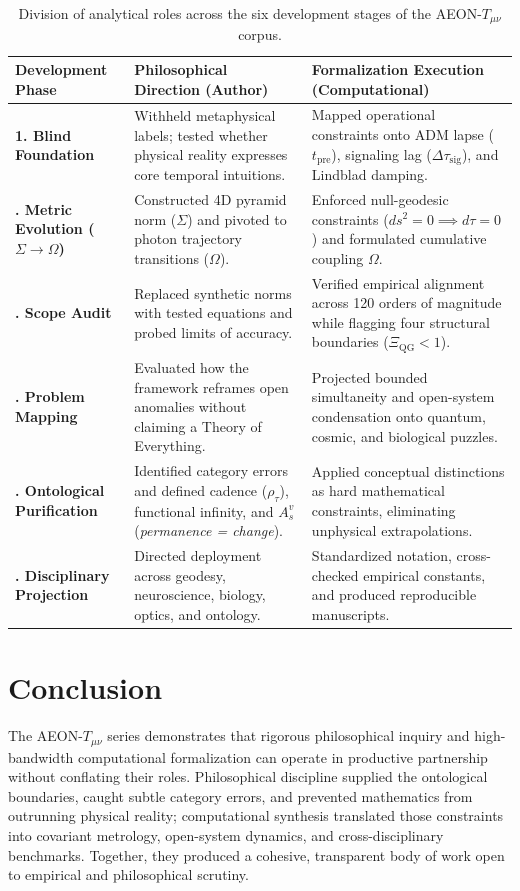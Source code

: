 \documentclass[11pt,a4paper]{article}
\begin{document}
\begin{table}[h!]
\centering
\small
\begin{tabularx}{\textwidth}{>{\bfseries}l X X}
\toprule
Development Phase & Philosophical Direction (Author) & Formalization Execution (Computational) \\
\midrule
1. Blind Foundation & Withheld metaphysical labels; tested whether physical reality expresses core temporal intuitions. & Mapped operational constraints onto ADM lapse ($t_{\mathrm{pre}}$), signaling lag ($\Delta\tau_{\mathrm{sig}}$), and Lindblad damping. \\
\addlinespace
2. Metric Evolution ($\Sigma \to \Omega$) & Constructed 4D pyramid norm ($\Sigma$) and pivoted to photon trajectory transitions ($\Omega$). & Enforced null-geodesic constraints ($ds^2 = 0 \implies d\tau = 0$) and formulated cumulative coupling $\Omega$. \\
\addlinespace
3. Scope Audit & Replaced synthetic norms with tested equations and probed limits of accuracy. & Verified empirical alignment across 120 orders of magnitude while flagging four structural boundaries ($\Xi_{\mathrm{QG}} < 1$). \\
\addlinespace
4. Problem Mapping & Evaluated how the framework reframes open anomalies without claiming a Theory of Everything. & Projected bounded simultaneity and open-system condensation onto quantum, cosmic, and biological puzzles. \\
\addlinespace
5. Ontological Purification & Identified category errors and defined cadence ($\rho_\tau$), functional infinity, and $A_s^v$ (\emph{permanence = change}). & Applied conceptual distinctions as hard mathematical constraints, eliminating unphysical extrapolations. \\
\addlinespace
6. Disciplinary Projection & Directed deployment across geodesy, neuroscience, biology, optics, and ontology. & Standardized notation, cross-checked empirical constants, and produced reproducible manuscripts. \\
\bottomrule
\end{tabularx}
\caption{Division of analytical roles across the six development stages of the AEON-$T_{\mu\nu}$ corpus.}
\end{table}

\section{Conclusion}

The AEON-$T_{\mu\nu}$ series demonstrates that rigorous philosophical inquiry and high-bandwidth computational formalization can operate in productive partnership without conflating their roles. Philosophical discipline supplied the ontological boundaries, caught subtle category errors, and prevented mathematics from outrunning physical reality; computational synthesis translated those constraints into covariant metrology, open-system dynamics, and cross-disciplinary benchmarks. Together, they produced a cohesive, transparent body of work open to empirical and philosophical scrutiny.
\end{document}
